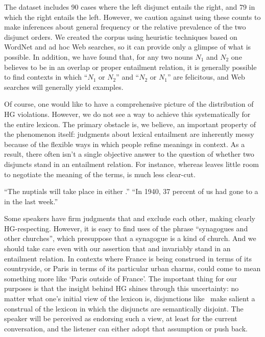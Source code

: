 \documentclass[12pt,twoside]{article}
\renewcommand{\_}{\textbf{\textunderscore\hspace{-4pt}\textunderscore\hspace{-3pt}\textunderscore\hspace{-4pt}\textunderscore}\hspace{0.5pt}}			%
\begin{document}
The dataset includes 90 cases where the left disjunct entails the
right, and 79 in which the right entails the left.  However, we
caution against using these counts to make inferences about general
frequency or the relative prevalence of the two disjunct orders. We
created the corpus using heuristic techniques based on WordNet
\citep{WordNet98} and ad hoc Web searches, so it can provide only a
glimpse of what is possible.  In addition, we have found that, for any
two nouns $N_{1}$ and $N_{2}$ one believes to be in an overlap or
proper entailment relation, it is generally possible to find contexts
in which ``$N_{1}$ or $N_{2}$'' and ``$N_{2}$ or $N_{1}$'' are
felicitous, and Web searches will generally yield examples.

Of course, one would like to have a comprehensive picture of the
distribution of HG violations. However, we do not see a way to achieve
this systematically for the entire lexicon. The primary obstacle is,
we believe, an important property of the phenomenon itself: judgments
about lexical entailment are inherently messy because of the flexible
ways in which people refine meanings in context. As a result, there
often isn't a single objective answer to the question of whether two
disjuncts stand in an entailment relation. For instance, whereas
 leaves little room to negotiate the
meaning of the terms,  is much
less clear-cut.
%
\begin{exe}
\ex\label{exclusive}
  \begin{xlist}
  \ex\label{franceorparis} ``The nuptials will take place in either
    .''
  \ex\label{churchorsynagogue} ``In 1940, 37 percent of us had gone
    to a  in the last week.''
  \end{xlist}
\end{exe}
%
Some speakers have firm judgments that  and
 exclude each other, making
 clearly HG-respecting. However,
it is easy to find uses of the phrase ``synagogues and other
churches'', which presuppose that a synagogue is a kind of church. And
we should take care even with our assertion that  and
 invariably stand in an entailment relation. In contexts
where France is being construed in terms of its countryside, or Paris
in terms of its particular urban charms,  could come to
mean something more like `Paris outside of France'. The important
thing for our purposes is that the insight behind HG shines through
this uncertainty: no matter what one's initial view of the lexicon is,
disjunctions like \XorY\ make salient a construal of the lexicon in
which the disjuncts are semantically disjoint. The speaker will be
perceived as endorsing such a view, at least for the current
conversation, and the listener can either adopt that assumption or
push back.
\end{document}
